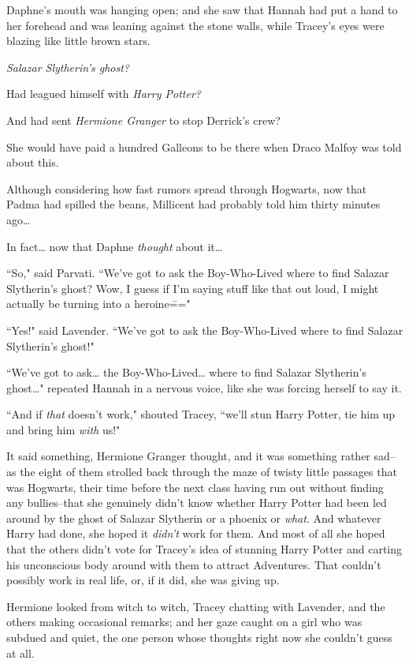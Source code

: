 Daphne's mouth was hanging open; and she saw that Hannah had put a hand to her forehead and was leaning against the stone walls, while Tracey's eyes were blazing like little brown stars.

\emph{Salazar Slytherin's ghost?}

Had leagued himself with \emph{Harry Potter?}

And had sent \emph{Hermione Granger} to stop Derrick's crew?

She would have paid a hundred Galleons to be there when Draco Malfoy was told about this.

Although considering how fast rumors spread through Hogwarts, now that Padma had spilled the beans, Millicent had probably told him thirty minutes ago{\ldots}

In fact{\ldots} now that Daphne \emph{thought} about it{\ldots}

``So," said Parvati. ``We've got to ask the Boy-Who-Lived where to find Salazar Slytherin's ghost? Wow, I guess if I'm saying stuff like that out loud, I might actually be turning into a heroine\==="

``Yes!" said Lavender. ``We've got to ask the Boy-Who-Lived where to find Salazar Slytherin's ghost!"

``We've got to ask{\ldots} the Boy-Who-Lived{\ldots} where to find Salazar Slytherin's ghost{\ldots}" repeated Hannah in a nervous voice, like she was forcing herself to say it.

``And if \emph{that} doesn't work," shouted Tracey, ``we'll stun Harry Potter, tie him up and bring him \emph{with} us!"

\later

It said something, Hermione Granger thought, and it was something rather sad\---as the eight of them strolled back through the maze of twisty little passages that was Hogwarts, their time before the next class having run out without finding any bullies\---that she genuinely didn't know whether Harry Potter had been led around by the ghost of Salazar Slytherin or a phoenix or \emph{what}. And whatever Harry had done, she hoped it \emph{didn't} work for them. And most of all she hoped that the others didn't vote for Tracey's idea of stunning Harry Potter and carting his unconscious body around with them to attract Adventures. That couldn't possibly work in real life, or, if it did, she was giving up.

Hermione looked from witch to witch, Tracey chatting with Lavender, and the others making occasional remarks; and her gaze caught on a girl who was subdued and quiet, the one person whose thoughts right now she couldn't guess at all.


